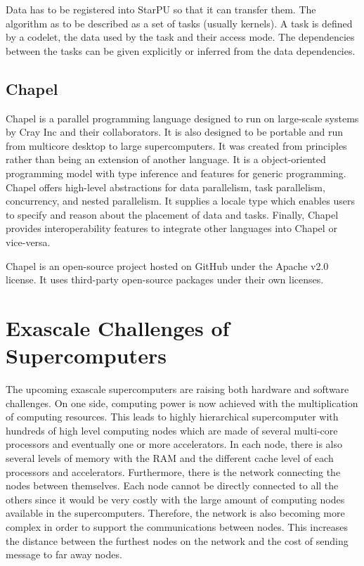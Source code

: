 Data has to be registered into StarPU so that it can transfer them.
The algorithm as to be described as a set of tasks (usually kernels).
A task is defined by a codelet, the data used by the task and their access mode.
The dependencies between the tasks can be given explicitly or inferred from the data dependencies.

\subsection{Chapel}
Chapel \cite{CalCZ2004} is a parallel programming language designed to run on large-scale systems by Cray Inc and their collaborators.
It is also designed to be portable and run from multicore desktop to large supercomputers.
It was created from principles rather than being an extension of another language.
It is a object-oriented programming model with type inference and features for generic programming.
Chapel offers high-level abstractions for data parallelism, task parallelism, concurrency, and nested parallelism.
It supplies a locale type which enables users to specify and reason about the placement of data and tasks.
Finally, Chapel provides interoperability features to integrate other languages into Chapel or vice-versa.

Chapel is an open-source project hosted on GitHub under the Apache v2.0 license.
It uses third-party open-source packages under their own licenses.


\section{Exascale Challenges of Supercomputers}
The upcoming exascale supercomputers are raising both hardware and software challenges.
On one side, computing power is now achieved with the multiplication of computing resources.
This leads to highly hierarchical supercomputer with hundreds of high level computing nodes which are made of several multi-core processors and eventually one or more accelerators.
In each node, there is also several levels of memory with the RAM and the different cache level of each processors and accelerators.
Furthermore, there is the network connecting the nodes between themselves.
Each node cannot be directly connected to all the others since it would be very costly with the large amount of computing nodes available in the supercomputers.
Therefore, the network is also becoming more complex in order to support the communications between nodes.
This increases the distance between the furthest nodes on the network and the cost of sending message to far away nodes.


